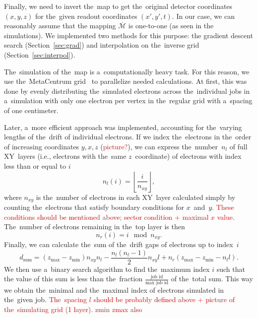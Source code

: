 		Finally, we need to invert the~map to get the~original detector coordinates $(x,y,z)$ for the~given readout coordinates $(x',y',t)$. In our case, we can reasonably assume that the mapping $\overbar{\mathcal{M}}$ is one-to-one (as seen in the simulations). We implemented two methods for this purpose: the gradient descent search (Section~\ref{sec:grad}) and interpolation on the~inverse grid (Section~\ref{sec:interpol}).
		
		The~simulation of the~map is a~computationally heavy task. For this reason, we use the~MetaCentrum grid~\cite{metacentrum} to parallelize needed calculations. At first, this was done by evenly distributing the~simulated electrons across the~individual jobs in a~simulation with only one electron per vertex in the~regular grid with a~spacing of one centimeter. 
		
		Later, a~more efficient approach was implemented, accounting for the~varying lengths of the~drift of individual electrons. If we index the~electrons in the~order of increasing coordinates $y,x,z$ (\textcolor{red}{picture?}), we can express the~number~$n_l$ of full XY~layers (i.e., electrons with the~same $z$~coordinate) of electrons with index less than or equal to $i$
			\begin{equation}
				n_l(i) = \left\lfloor\frac{i}{n_{xy}}\right\rfloor,
			\end{equation}
		where $n_{xy}$ is the~number of electrons in each XY~layer calculated simply by counting the~electrons that satisfy boundary conditions for $x$~and~$y$. \textcolor{red}{These conditions should be mentioned above; sector condition + maximal $x$ value.} The~number of electrons remaining in the~top layer is then
			\begin{equation}
				n_r(i) = i\!\!\!\!\mod n_{xy}.
			\end{equation}
		Finally, we can calculate the~sum of the~drift gaps of electrons up to index~$i$
			\begin{equation}
				d_\text{sum} = (z_\text{max}-z_\text{min})n_{xy}n_l-\frac{n_l(n_l-1)}{2}n_{xy}l+n_r(z_\text{max}-z_\text{min}-n_l l).
			\end{equation}
		We then use a~binary search algorithm to find the~maximum index $i$ such that the value of this sum is less than the~fraction $\frac{\text{job id}}{\text{max job id}}$ of the~total sum. This way we obtain the~minimal and the~maximal index of electrons simulated in the~given job.
		\textcolor{red}{The~spacing $l$ should be probably defined above + picture of the~simulating grid (1 layer). zmin zmax also}
		
